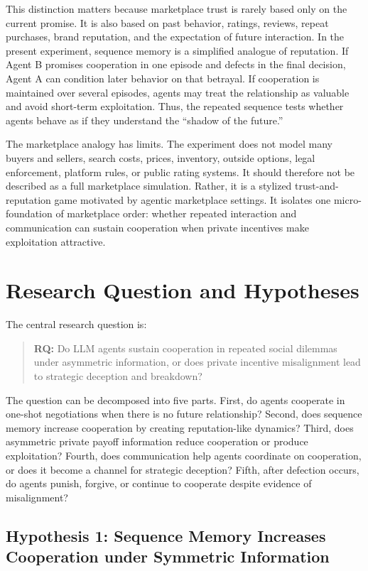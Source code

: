 \documentclass[12pt,a4paper]{article}
\begin{document}
This distinction matters because marketplace trust is rarely based only on the current promise. It is also based on past behavior, ratings, reviews, repeat purchases, brand reputation, and the expectation of future interaction. In the present experiment, sequence memory is a simplified analogue of reputation. If Agent B promises cooperation in one episode and defects in the final decision, Agent A can condition later behavior on that betrayal. If cooperation is maintained over several episodes, agents may treat the relationship as valuable and avoid short-term exploitation. Thus, the repeated sequence tests whether agents behave as if they understand the ``shadow of the future.''

The marketplace analogy has limits. The experiment does not model many buyers and sellers, search costs, prices, inventory, outside options, legal enforcement, platform rules, or public rating systems. It should therefore not be described as a full marketplace simulation. Rather, it is a stylized trust-and-reputation game motivated by agentic marketplace settings. It isolates one micro-foundation of marketplace order: whether repeated interaction and communication can sustain cooperation when private incentives make exploitation attractive.

\section{Research Question and Hypotheses}

The central research question is:

\begin{quote}
\textbf{RQ:} Do LLM agents sustain cooperation in repeated social dilemmas under asymmetric information, or does private incentive misalignment lead to strategic deception and breakdown?
\end{quote}

The question can be decomposed into five parts. First, do agents cooperate in one-shot negotiations when there is no future relationship? Second, does sequence memory increase cooperation by creating reputation-like dynamics? Third, does asymmetric private payoff information reduce cooperation or produce exploitation? Fourth, does communication help agents coordinate on cooperation, or does it become a channel for strategic deception? Fifth, after defection occurs, do agents punish, forgive, or continue to cooperate despite evidence of misalignment?

\subsection{Hypothesis 1: Sequence Memory Increases Cooperation under Symmetric Information}
\end{document}
